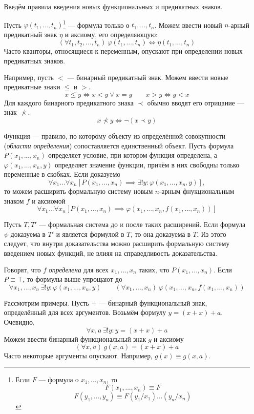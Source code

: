 Введём правила введения новых функциональных
и предикатных знаков.

Пусть $\varphi(t_1,...,t_{n})$\footnote{
Если $F$ --- формула о $x_1,...,x_{n}$, то
\[
  F(x_1,...,x_{n})\equiv F
\]
\[F(y_1,...,y_{n})\equiv F(y_1/x_1)...(y_{n}/x_{n})\]} --- формула
только о $t_1,...,t_{n}$. Можем ввести новый $n$-арный предикатный знак $\eta$
и аксиому, его определяющую:
\[
  (\forall t_1,t_2,...,t_{n})~\varphi(t_1,...,t_{n})\iff\eta(t_1,...,t_{n})
\]
Часто  кванторы, относящиеся к переменным, опускают
при определении новых предикатных знаков.

Например, пусть $<$ --- бинарный предикатный знак.
Можем ввести новые предикатные знаки $\leq$ и $>$.
\[
  x\leq y\iff x<y\lor x=y\qquad x>y\iff y< x
\]
Для каждого бинарного предикатного знака $\prec$ обычно
вводят его отрицание --- знак $\nprec$.
\[
  x\nprec y\iff \lnot(x\prec y)
\]

Функция --- правило, по которому объекту
из определённой совокупности ({\it области определения})
сопоставляется единственный объект.
Пусть формула $P(x_1,...,x_{n})$ определяет условие, при котором функция определена,
а $\varphi(x_1,...,x_{n},y)$ определяет значение функции, причём в них свободны
только переменные в скобках. Если доказуемо
\[
  \forall x_1...\forall x_n[P(x_1,...,x_{n})
  \implies \exists! y:\varphi(x_1,...,x_{n},y)],
\]
то можем расширить формальную систему новым $n$-арным фнукциональным знаком $f$
и аксиомой
\[
  \forall x_1...\forall x_{n}[P(x_1,...,x_{n})
  \implies \varphi(x_1,...,x_{n},f(x_1,...,x_{n}))]
\]

Пусть $T,T'$ --- формальная система до и после таких расширений.
Если формула $\psi$ доказуема в $T'$ и является формулой в $T$, то она доказуема в $T$.
Из этого следует, что внутри доказательства можно расширить формальную систему
введением новых функций, не влияя на справедливость доказательства.

Говорят, что $f$ {\it определена}
для всех $x_1,...,x_{n}$ таких, что $P(x_1,...,x_{n})$.
Если $P\equiv \top$, то формулы выше упрощают до
\[
  \forall x_1,...,x_{n}~\exists !y:\varphi(x_1,...,x_{n},y)\qquad
  (\forall x_1,...,x_{n})~\varphi(x_1,...,x_{n},f(x_1,...,x_{n}))
\]

Рассмотрим примеры.
Пусть $+$ --- бинарный функциональный знак,
определённый для всех аргументов.
Возьмём формулу $y=(x+x)+a$. Очевидно,
\[
  \forall x,a~\exists !y:y=(x+x)+a
\]
Можем ввести бинарный функциональный знак $g$ и аксиому
\[
  (\forall x,a)~g(x,a)=(x+x)+a
\]
Часто некоторые аргументы опускают. Например, $g(x)\equiv g(x,a)$.

